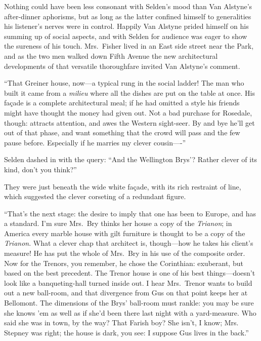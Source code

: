 \documentclass[12pt,a4paper]{book}
\begin{document}
Nothing could have been less consonant with Selden's mood than
Van Alstyne's after-dinner aphorisms, but as long as the latter
confined himself to generalities his listener's nerves were in
control. Happily Van Alstyne prided himself on his summing up of
social aspects, and with Selden for audience was eager to show
the sureness of his touch. Mrs.\ Fisher lived in an East side
street near the Park, and as the two men walked down Fifth Avenue
the new architectural developments of that versatile thoroughfare
invited Van Alstyne's comment.





``That Greiner house, now---a typical rung in the social ladder! 
The man who built it came from a \textit{milieu} where all the dishes are
put on the table at once. His fa\c{c}ade is a complete architectural
meal; if he had omitted a style his friends might have thought
the money had given out. Not a bad purchase for Rosedale, though: 
attracts attention, and awes the Western sight-seer. By and bye
he'll get out of that phase, and want something that the crowd
will pass and the few pause before. Especially if he marries my
clever cousin----''





Selden dashed in with the query: ``And the Wellington Brys'? 
Rather clever of its kind, don't you think?''





They were just beneath the wide white fa\c{c}ade, with its rich
restraint of line, which suggested the clever corseting of a
redundant figure.





``That's the next stage: the desire to imply that one has been to
Europe, and has a standard. I'm sure Mrs.\ Bry thinks her house a
copy of the \textit{Trianon}; in America every marble house with gilt
furniture is thought to be a copy of the \textit{Trianon}. What a clever
chap that architect is, though---how he takes his client's
measure! He has put the whole of Mrs.\ Bry in his use of the
composite order. Now for the Trenors, you remember, he chose the
Corinthian: exuberant, but based on the best precedent. The
Trenor house is one of his best things---doesn't look like a
banqueting-hall turned inside out. I hear Mrs.\ Trenor wants to
build out a new ball-room, and that divergence from Gus on that
point keeps her at Bellomont. The dimensions of the Brys'
ball-room must rankle: you may be sure she knows 'em as well as
if she'd been there last night with a yard-measure. Who said she
was in town, by the way? That Farish boy? She isn't, I know; Mrs.
Stepney was right; the house is dark, you see: I suppose Gus
lives in the back.''
\end{document}
